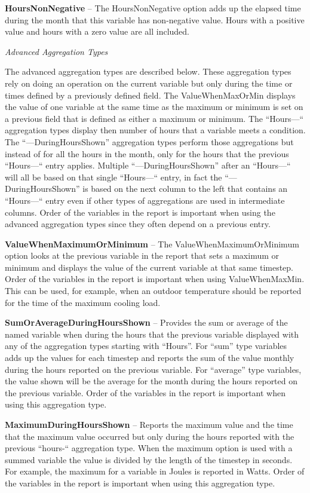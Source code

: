 \textbf{HoursNonNegative} -- The HoursNonNegative option adds up the elapsed time during the month that this variable has non-negative value. Hours with a positive value and hours with a zero value are all included.

\emph{Advanced Aggregation Types}

The advanced aggregation types are described below. These aggregation types rely on doing an operation on the current variable but only during the time or times defined by a previously defined field. The ValueWhenMaxOrMin displays the value of one variable at the same time as the maximum or minimum is set on a previous field that is defined as either a maximum or minimum. The ``Hours---`` aggregation types display then number of hours that a variable meets a condition. The ``---DuringHoursShown'' aggregation types perform those aggregations but instead of for all the hours in the month, only for the hours that the previous ``Hours---`` entry applies. Multiple ``---DuringHoursShown'' after an ``Hours---`` will all be based on that single ``Hours---`` entry, in fact the ``---DuringHoursShown'' is based on the next column to the left that contains an ``Hours---`` entry even if other types of aggregations are used in intermediate columns. Order of the variables in the report is important when using the advanced aggregation types since they often depend on a previous entry.

\textbf{ValueWhenMaximumOrMinimum} -- The ValueWhenMaximumOrMinimum option looks at the previous variable in the report that sets a maximum or minimum and displays the value of the current variable at that same timestep. Order of the variables in the report is important when using ValueWhenMaxMin. This can be used, for example, when an outdoor temperature should be reported for the time of the maximum cooling load.

\textbf{SumOrAverageDuringHoursShown} -- Provides the sum or average of the named variable when during the hours that the previous variable displayed with any of the aggregation types starting with ``Hours''. For ``sum'' type variables adds up the values for each timestep and reports the sum of the value monthly during the hours reported on the previous variable. For ``average'' type variables, the value shown will be the average for the month during the hours reported on the previous variable. Order of the variables in the report is important when using this aggregation type.

\textbf{MaximumDuringHoursShown} -- Reports the maximum value and the time that the maximum value occurred but only during the hours reported with the previous ``hours-`` aggregation type. When the maximum option is used with a summed variable the value is divided by the length of the timestep in seconds. For example, the maximum for a variable in Joules is reported in Watts. Order of the variables in the report is important when using this aggregation type.


